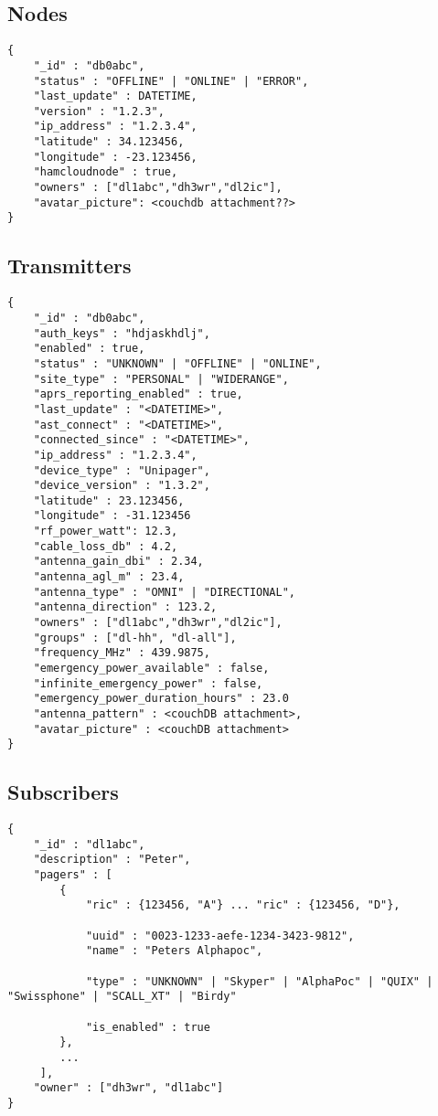 \subsection{Nodes}
\begin{lstlisting}
{
	"_id" : "db0abc",
	"status" : "OFFLINE" | "ONLINE" | "ERROR",
	"last_update" : DATETIME,
    "version" : "1.2.3",
    "ip_address" : "1.2.3.4",
    "latitude" : 34.123456,
    "longitude" : -23.123456,
    "hamcloudnode" : true,
    "owners" : ["dl1abc","dh3wr","dl2ic"],
    "avatar_picture": <couchdb attachment??>
}
\end{lstlisting}

\subsection{Transmitters}

\begin{lstlisting}
{
	"_id" : "db0abc",
    "auth_keys" : "hdjaskhdlj",
    "enabled" : true,
	"status" : "UNKNOWN" | "OFFLINE" | "ONLINE",
	"site_type" : "PERSONAL" | "WIDERANGE",
	"aprs_reporting_enabled" : true,
    "last_update" : "<DATETIME>",
	"ast_connect" : "<DATETIME>",
	"connected_since" : "<DATETIME>",
    "ip_address" : "1.2.3.4",
    "device_type" : "Unipager",
    "device_version" : "1.3.2",
    "latitude" : 23.123456,
    "longitude" : -31.123456
    "rf_power_watt": 12.3,
    "cable_loss_db" : 4.2,
    "antenna_gain_dbi" : 2.34,
	"antenna_agl_m" : 23.4,
	"antenna_type" : "OMNI" | "DIRECTIONAL",
	"antenna_direction" : 123.2,
    "owners" : ["dl1abc","dh3wr","dl2ic"],
    "groups" : ["dl-hh", "dl-all"],
    "frequency_MHz" : 439.9875,
    "emergency_power_available" : false,
    "infinite_emergency_power" : false,
	"emergency_power_duration_hours" : 23.0        
    "antenna_pattern" : <couchDB attachment>,
    "avatar_picture" : <couchDB attachment>
}
\end{lstlisting}

 
\subsection{Subscribers}
\begin{lstlisting}
{
	"_id" : "dl1abc",
	"description" : "Peter",
	"pagers" : [
		{
    		"ric" : {123456, "A"} ... "ric" : {123456, "D"},

			"uuid" : "0023-1233-aefe-1234-3423-9812",
    		"name" : "Peters Alphapoc",

			"type" : "UNKNOWN" | "Skyper" | "AlphaPoc" | "QUIX" | "Swissphone" | "SCALL_XT" | "Birdy"

			"is_enabled" : true
     	},
     	...
     ],
    "owner" : ["dh3wr", "dl1abc"]
}
\end{lstlisting}

